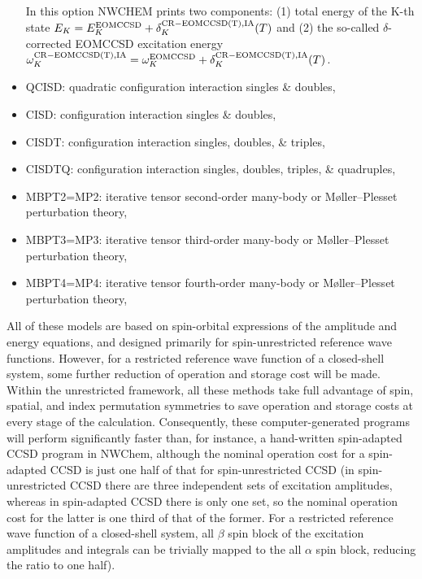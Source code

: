 \begin{itemize}
In this option NWCHEM prints two components: (1) total energy of the K-th state 
$E_K=E_K^{\rm EOMCCSD}+\delta_K^{\rm CR-EOMCCSD(T),IA}(T)$ and (2)
the so-called $\delta$-corrected EOMCCSD excitation energy
$\omega_K^{\rm CR-EOMCCSD(T),IA}=\omega_K^{\rm EOMCCSD}+\delta_K^{\rm CR-EOMCCSD(T),IA}(T)$.
\item QCISD: quadratic configuration interaction singles \& doubles,
\item CISD: configuration interaction singles \& doubles,
\item CISDT: configuration interaction singles, doubles, \& triples,
\item CISDTQ: configuration interaction singles, doubles, triples, \& quadruples,
\item MBPT2=MP2: iterative tensor second-order many-body or M\o ller--Plesset perturbation theory,
\item MBPT3=MP3: iterative tensor third-order many-body or M\o ller--Plesset perturbation theory,
\item MBPT4=MP4: iterative tensor fourth-order many-body or M\o ller--Plesset perturbation theory,
\end{itemize}

All of these models are based on spin-orbital expressions of the amplitude and energy equations, 
and designed primarily for spin-unrestricted reference wave functions.  However, for a restricted 
reference wave function of a closed-shell system, some further reduction of operation and storage
cost will be made.  Within the unrestricted framework, all these methods take full advantage
of spin, spatial, and index permutation symmetries to save operation and storage costs at every
stage of the calculation.  Consequently, these computer-generated programs will perform significantly
faster than, for instance, a hand-written spin-adapted CCSD program in NWChem, although the nominal 
operation cost for a spin-adapted CCSD is just one half of that for spin-unrestricted CCSD (in spin-unrestricted
CCSD there are three independent sets of excitation amplitudes, whereas in spin-adapted CCSD there
is only one set, so the nominal operation cost for the latter is one third of that of the former.  For 
a restricted reference wave function of a closed-shell system, all $\beta$ spin block of the excitation
amplitudes and integrals can be trivially mapped to the all $\alpha$ spin block, reducing the ratio
to one half).

